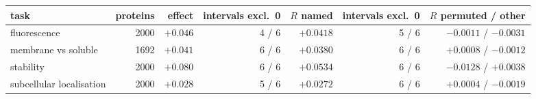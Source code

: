 \begin{adjustbox}{max width=\linewidth}
\begin{tabular}{lrrrrrr}
\toprule
\rowcolor{CompassLavender!32}
task & proteins & effect & intervals excl.\ 0 & $R$ named & intervals excl.\ 0 & $R$ permuted / other \\
\midrule
fluorescence & 2000 & $+0.046$ & 4 / 6 & $+0.0418$ & 5 / 6 & $-0.0011$ / $-0.0031$ \\
membrane vs soluble & 1692 & $+0.041$ & 6 / 6 & $+0.0380$ & 6 / 6 & $+0.0008$ / $-0.0012$ \\
stability & 2000 & $+0.080$ & 6 / 6 & $+0.0534$ & 6 / 6 & $-0.0128$ / $+0.0038$ \\
subcellular localisation & 2000 & $+0.028$ & 5 / 6 & $+0.0272$ & 6 / 6 & $+0.0004$ / $-0.0019$ \\
\bottomrule
\end{tabular}
\end{adjustbox}
